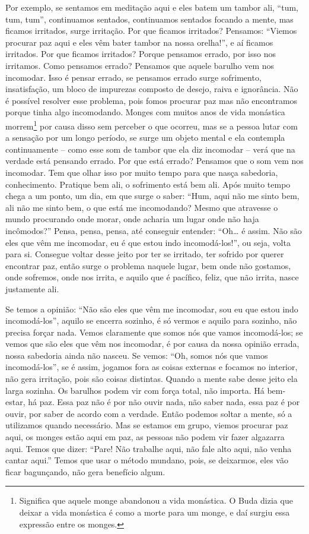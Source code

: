 Por exemplo, se sentamos em meditação aqui e eles batem um tambor
ali, “tum, tum, tum”, continuamos sentados, continuamos sentados
focando a mente, mas ficamos irritados, surge irritação. Por que
ficamos irritados? Pensamos: “Viemos procurar paz aqui e eles vêm bater
tambor na nossa orelha!”, e aí ficamos irritados. Por que ficamos
irritados? Porque pensamos errado, por isso nos irritamos. Como
pensamos errado? Pensamos que aquele barulho vem nos incomodar. Isso é
pensar errado, se pensamos errado surge sofrimento, insatisfação, um
bloco de impurezas composto de desejo, raiva e ignorância. Não é
possível resolver esse problema, pois fomos procurar paz mas não
encontramos porque tinha algo incomodando. Monges com muitos anos de
vida monástica morrem\footnote{Significa que aquele monge abandonou a
vida monástica. O Buda dizia que deixar a vida monástica é como a morte
para um monge, e daí surgiu essa expressão entre os monges.} por causa
disso sem perceber o que ocorreu, mas se a pessoa lutar com a sensação
por um longo período, se surge um objeto mental e ela contempla
continuamente – como esse som de tambor que ela diz incomodar – verá
que na verdade está pensando errado. Por que está errado? Pensamos que
o som vem nos incomodar. Tem que olhar isso por muito tempo para que
nasça sabedoria, conhecimento. Pratique bem ali, o sofrimento está bem
ali. Após muito tempo chega a um ponto, um dia, em que surge o saber:
“Hum, aqui não me sinto bem, ali não me sinto bem, o que está me
incomodando? Mesmo que atravesse o mundo procurando onde morar, onde
acharia um lugar onde não haja incômodos?” Pensa, pensa, pensa, até
conseguir entender: “Oh… é assim. Não são eles que vêm me incomodar, eu
é que estou indo incomodá-los!”, ou seja, volta para si. Consegue
voltar desse jeito por ter se irritado, ter sofrido por querer
encontrar paz, então surge o problema naquele lugar, bem onde não
gostamos, onde sofremos, onde nos irrita, e aquilo que é pacífico,
feliz, que não irrita, nasce justamente ali. 

Se temos a opinião: “Não são eles que vêm me incomodar, sou eu que
estou indo incomodá-los”, aquilo se encerra sozinho, é só vermos e
aquilo para sozinho, não precisa forçar nada. Vemos claramente que
somos nós que vamos incomodá-los; se vemos que são eles que vêm nos
incomodar, é por causa da nossa opinião errada, nossa sabedoria ainda
não nasceu. Se vemos: “Oh, somos nós que vamos incomodá-los”, se é
assim, jogamos fora as coisas externas e focamos no interior, não gera
irritação, pois são coisas distintas. Quando a mente sabe desse jeito
ela larga sozinha. Os barulhos podem vir com força total, não importa.
Há bem-estar, há paz. Essa paz não é por não ouvir nada, não saber
nada, essa paz é por ouvir, por saber de acordo com a verdade. Então
podemos soltar a mente, só a utilizamos quando necessário. Mas se
estamos em grupo, viemos procurar paz aqui, os monges estão aqui em
paz, as pessoas não podem vir fazer algazarra aqui. Temos que dizer:
“Pare! Não trabalhe aqui, não fale alto aqui, não venha cantar aqui.”
Temos que usar o método mundano, pois, se deixarmos, eles vão ficar
bagunçando, não gera benefício algum. 

